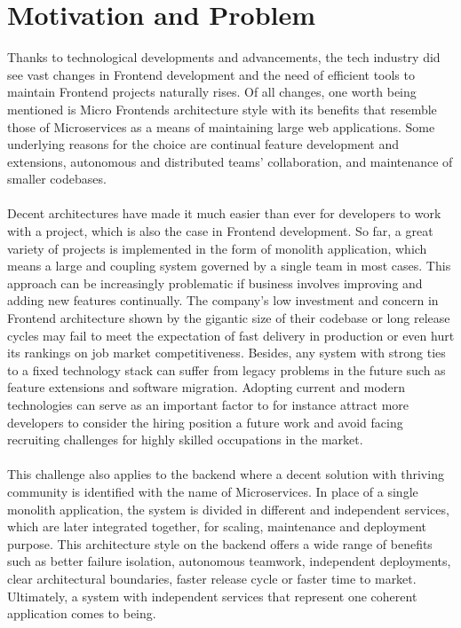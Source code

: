 \documentclass[a4paper]{book}
\begin{document}
 \section{Motivation and Problem}
Thanks to technological developments and advancements, the tech industry did see vast changes in Frontend development and the need of efficient tools to maintain Frontend projects naturally rises. Of all changes, one worth being mentioned is Micro Frontends architecture style with its benefits that resemble those of Microservices as a means of maintaining large web applications. Some underlying reasons for the choice are continual feature development and extensions, autonomous and distributed teams’ collaboration, and maintenance of smaller codebases. 
\\
\\
Decent architectures have made it much easier than ever for developers to work with a project, which is also the case in Frontend development. So far, a great variety of projects is implemented in the form of monolith application, which means a large and coupling system governed by a single team in most cases. This approach can be increasingly problematic if business involves improving and adding new features continually. The company’s low investment and concern in Frontend architecture shown by the gigantic size of their codebase or long release cycles may fail to meet the expectation of fast delivery in production or even hurt its rankings on job market competitiveness. Besides, any system with strong ties to a fixed technology stack can suffer from legacy problems in the future such as feature extensions and software migration. Adopting current and modern technologies can serve as an important factor to for instance attract more developers to consider the hiring position a future work and avoid facing recruiting challenges for highly skilled occupations in the market.
\\
\\
This challenge also applies to the backend where a decent solution with thriving community is identified with the name of Microservices. In place of a single monolith application, the system is divided in different and independent services, which are later integrated together, for scaling, maintenance and deployment purpose. This architecture style on the backend offers a wide range of benefits such as better failure isolation, autonomous teamwork, independent deployments, clear architectural boundaries, faster release cycle or faster time to market. Ultimately, a system with independent services that represent one coherent application comes to being.
\end{document}
